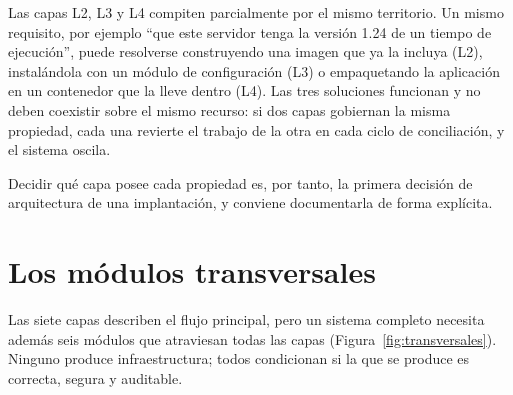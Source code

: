 \documentclass[11pt,letterpaper]{article}
\begin{document}
Las capas L2, L3 y L4 compiten parcialmente por el mismo territorio. Un mismo
requisito, por ejemplo \enquote{que este servidor tenga la versión 1.24 de un
tiempo de ejecución}, puede resolverse construyendo una imagen que ya la
incluya (L2), instalándola con un módulo de configuración (L3) o empaquetando
la aplicación en un contenedor que la lleve dentro (L4). Las tres soluciones
funcionan y no deben coexistir sobre el mismo recurso: si dos capas gobiernan
la misma propiedad, cada una revierte el trabajo de la otra en cada ciclo de
conciliación, y el sistema oscila.

Decidir qué capa posee cada propiedad es, por tanto, la primera decisión de
arquitectura de una implantación, y conviene documentarla de forma explícita.

\section{Los módulos transversales}
\label{sec:transversales}

Las siete capas describen el flujo principal, pero un sistema completo
necesita además seis módulos que atraviesan todas las capas
(Figura~\ref{fig:transversales}). Ninguno produce infraestructura; todos
condicionan si la que se produce es correcta, segura y auditable.
\end{document}
